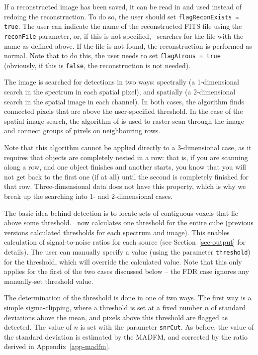 If a reconstructed image has been saved, it can be read in and used
instead of redoing the reconstruction. To do so, the user should set
\texttt{flagReconExists = true}. The user can indicate the name of the
reconstructed FITS file using the \texttt{reconFile} parameter, or, if
this is not specified, \duchamp\ searches for the file with the name
as defined above. If the file is not found, the reconstruction is
performed as normal. Note that to do this, the user needs to set
\texttt{flagAtrous = true} (obviously, if this is \texttt{false}, the
reconstruction is not needed).

\label{sec-detection}

The image is searched for detections in two ways: spectrally (a
1-dimensional search in the spectrum in each spatial pixel), and
spatially (a 2-dimensional search in the spatial image in each
channel). In both cases, the algorithm finds connected pixels that are
above the user-specified threshold. In the case of the spatial image
search, the algorithm of \citet{lutz80} is used to raster-scan through
the image and connect groups of pixels on neighbouring rows.

Note that this algorithm cannot be applied directly to a 3-dimensional
case, as it requires that objects are completely nested in a row: that
is, if you are scanning along a row, and one object finishes and
another starts, you know that you will not get back to the first one
(if at all) until the second is completely finished for that
row. Three-dimensional data does not have this property, which is why
we break up the searching into 1- and 2-dimensional cases.

The basic idea behind detection is to locate sets of contiguous voxels
that lie above some threshold. \duchamp\ now calculates one threshold
for the entire cube (previous versions calculated thresholds for each
spectrum and image). This enables calculation of signal-to-noise
ratios for each source (see Section~\ref{sec-output} for details). The
user can manually specify a value (using the parameter
\texttt{threshold}) for the threshold, which will override the
calculated value. Note that this only applies for the first of the two
cases discussed below -- the FDR case ignores any manually-set
threshold value.

The determination of the threshold is done in one of two ways. The
first way is a simple sigma-clipping, where a threshold is set at a
fixed number $n$ of standard deviations above the mean, and pixels
above this threshold are flagged as detected. The value of $n$ is set
with the parameter \texttt{snrCut}. As before, the value of the
standard deviation is estimated by the MADFM, and corrected by the
ratio derived in Appendix~\ref{app-madfm}.

